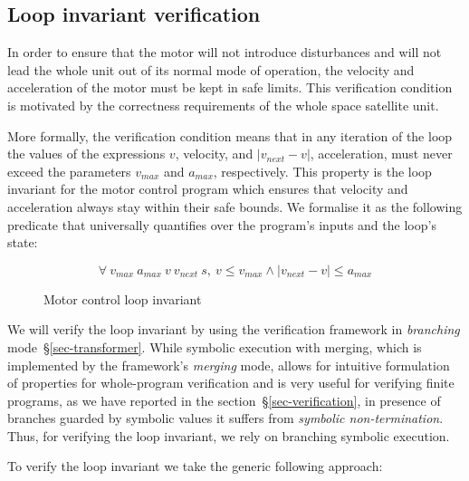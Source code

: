 \subsection{Loop invariant verification}

In order to ensure that the motor will not introduce disturbances
and will not lead the whole unit out of its normal mode of operation, the velocity and
acceleration of the motor must be kept in safe limits. This verification condition
is motivated by the correctness requirements of the whole space satellite unit.

More formally, the verification condition means
that in any iteration of the loop the values of the
expressions $v$, velocity, and $\left| v_{next} - v \right|$,
acceleration, must never exceed the parameters $v_{max}$ and $a_{max}$, respectively.
This property is the loop invariant for the motor control program which
ensures that velocity and acceleration always stay within their safe bounds. We
formalise it as the following predicate that universally quantifies over the
program's inputs and the loop's state:

\begin{figure}[h]
\begin{tcolorbox}
\LARGE{
\[
  \forall\ v_{max}\ a_{max}\ v\ v_{next}\ s,
  \ v \leq v_{max} \land \left| v_{next} - v \right| \leq a_{max}
\]}
\end{tcolorbox}
\caption{Motor control loop invariant\label{fig-loop-invariant}}
\end{figure}

\noindent
We will verify the loop invariant by using the verification framework in
\emph{branching} mode~\S\ref{sec-transformer}. While symbolic execution with
merging, which is implemented by the framework's \emph{merging} mode, allows
for intuitive formulation of properties for whole-program verification and
is very useful for verifying finite programs, as we have
reported in the section~\S\ref{sec-verification}, in presence of branches guarded
by symbolic values it suffers from \emph{symbolic non-termination}.
Thus, for verifying the loop invariant, we rely on branching symbolic execution.

To verify the loop invariant we take the generic following approach:

